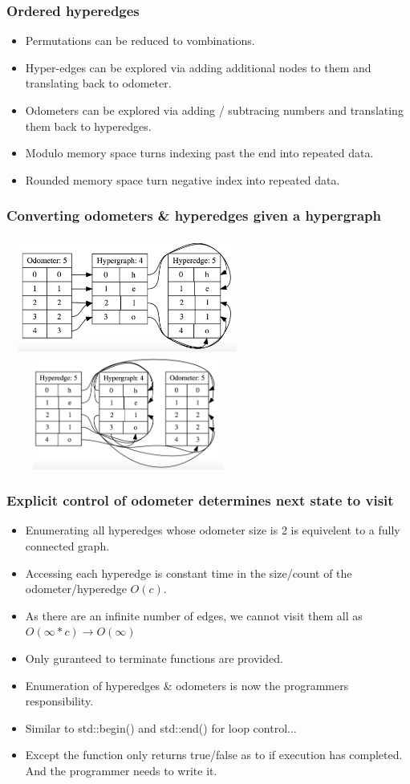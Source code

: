 \documentclass{beamer}
\begin{document}
	\begin{frame}
	\frametitle{Ordered hyperedges}
	\begin{itemize}
	\item Permutations can be reduced to vombinations.
	\item Hyper-edges can be explored via adding additional nodes to them and translating back to odometer.
	\item Odometers can be explored via adding / subtracing numbers and translating them back to hyperedges.
	\item Modulo memory space turns indexing past the end into repeated data.
	\item Rounded memory space turn negative index into repeated data. 
	\end{itemize}
	\end{frame}
	
	
	\begin{frame}
	\frametitle{Converting odometers \& hyperedges given a hypergraph}
    \includegraphics[width=8cm, height=3.75cm]{HelloHyper} \\
	\includegraphics[width=8cm, height=3.75cm]{HelloOdometer}
	\end{frame}	
	
	\begin{frame}
	\frametitle{Explicit control of odometer determines next state to visit}
	\begin{itemize}
	\item Enumerating all hyperedges whose odometer size is 2 is equivelent to a fully connected graph.
	\item Accessing each hyperedge is constant time in the size/count of the odometer/hyperedge $O(c)$.
	\item As there are an infinite number of edges, we cannot visit them all as $O(\infty * c) \rightarrow O(\infty)$
	\item Only guranteed to terminate functions are provided.
	\item Enumeration of hyperedges \& odometers is now the programmers responsibility. 
	\item Similar to std::begin() and std::end() for loop control... 
	\item Except the function only returns true/false as to if execution has completed. And the programmer needs to write it.
	\end{itemize}
	\end{frame}
	
\end{document}
